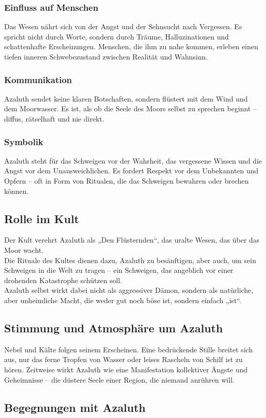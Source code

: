 \subsubsection*{Einfluss auf Menschen}
Das Wesen nährt sich von der Angst und der Sehnsucht nach Vergessen. Es spricht nicht durch Worte, sondern durch Träume, Halluzinationen und schattenhafte Erscheinungen. Menschen, die ihm zu nahe kommen, erleben einen tiefen inneren Schwebezustand zwischen Realität und Wahnsinn.
\subsubsection*{Kommunikation}
Azaluth sendet keine klaren Botschaften, sondern flüstert mit dem Wind und dem Moorwasser. Es ist, als ob die Seele des Moors selbst zu sprechen beginnt – diffus, rätselhaft und nie direkt.
\subsubsection*{Symbolik}
Azaluth steht für das Schweigen vor der Wahrheit, das vergessene Wissen und die Angst vor dem Unausweichlichen. Es fordert Respekt vor dem Unbekannten und Opfern – oft in Form von Ritualen, die das Schweigen bewahren oder brechen können.
\subsection{Rolle im Kult}
Der Kult verehrt Azaluth als „Den Flüsternden“, das uralte Wesen, das über das Moor wacht.\\
Die Rituale des Kultes dienen dazu, Azaluth zu besänftigen, aber auch, um sein Schweigen in die Welt zu tragen – ein Schweigen, das angeblich vor einer drohenden Katastrophe schützen soll.\\
Azaluth selbst wirkt dabei nicht als aggressiver Dämon, sondern als natürliche, aber unheimliche Macht, die weder gut noch böse ist, sondern einfach „ist“.
\subsection{Stimmung und Atmosphäre um Azaluth}
Nebel und Kälte folgen seinem Erscheinen.
Eine bedrückende Stille breitet sich aus, nur das ferne Tropfen von Wasser oder leises Rascheln von Schilf ist zu hören.
Zeitweise wirkt Azaluth wie eine Manifestation kollektiver Ängste und Geheimnisse – die düstere Seele einer Region, die niemand anrühren will.
\subsection{Begegnungen mit Azaluth}
